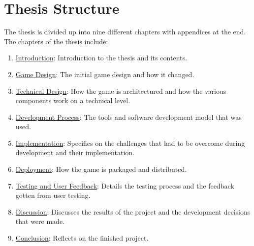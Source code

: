 \section{Thesis Structure}
The thesis is divided up into nine different chapters with appendices at the end. The chapters of the thesis include:
\begin{enumerate}
    \item \hyperref[chap:introduction]{Introduction}: Introduction to the thesis and its contents.
    \item \hyperref[chap:gamedesign]{Game Design}: The initial game design and how it changed. 
    \item \hyperref[chap:technical]{Technical Design}: How the game is architectured and how the various components work on a technical level.
    \item \hyperref[chap:process]{Development Process}: The tools and software development model that was used. 
    \item \hyperref[chap:implementation]{Implementation}: Specifics on the challenges that had to be overcome during development and their implementation.
    \item \hyperref[chap:deployment]{Deployment}: How the game is packaged and distributed.
    \item \hyperref[chap:testing]{Testing and User Feedback}: Details the testing process and the feedback gotten from user testing.  
    \item \hyperref[chap:discussion]{Discussion}: Discusses the results of the project and the development decisions that were made.
    \item \hyperref[chap:conclusion]{Conclusion}: Reflects on the finished project. 
\end{enumerate}
    
